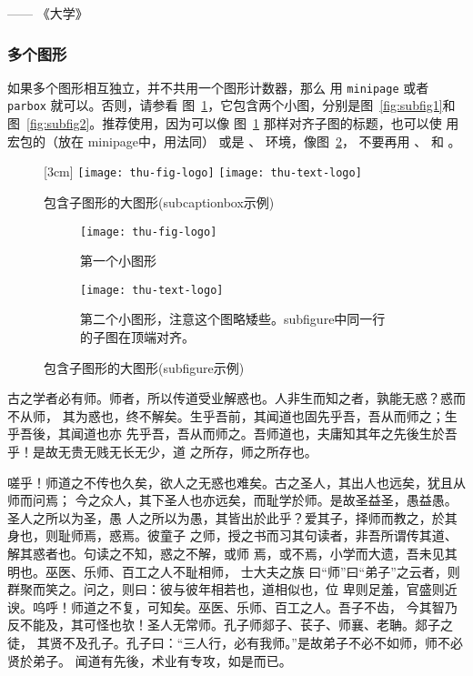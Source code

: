 \hfill —— 《大学》


\subsubsection{多个图形}
\label{sec:multifig}

如果多个图形相互独立，并不共用一个图形计数器，那么
用 \texttt{minipage} 或者\texttt{parbox} 就可以。否则，请参看
图~\ref{fig:big1-subcaptionbox}，它包含两个小图，分别是图~\ref{fig:subfig1}和
图~\ref{fig:subfig2}。推荐使用，因为可以像
图~\ref{fig:big1-subcaptionbox} 那样对齐子图的标题，也可以使
用宏包的（放在 minipage中，用法同）
或是  、 环境，像图~\ref{fig:big1-subfigure}，
不要再用 、 和 。

\begin{figure}[h]
  \centering%
  [3cm] %
    {\texttt{[image: thu-fig-logo]}}%
  \hspace{4em}%
      {\texttt{[image: thu-text-logo]}}
  \caption{包含子图形的大图形(subcaptionbox示例)}
  \label{fig:big1-subcaptionbox}
\end{figure}
\begin{figure}[h]
  \centering%
  \begin{subfigure}{3cm}
    \texttt{[image: thu-fig-logo]}
    \caption{第一个小图形}
  \end{subfigure}%
  \hspace{4em}%
  \begin{subfigure}{0.5\textwidth}
    \texttt{[image: thu-text-logo]}
    \caption{第二个小图形，注意这个图略矮些。subfigure中同一行的子图在顶端对齐。}
  \end{subfigure}
  \caption{包含子图形的大图形(subfigure示例)}
  \label{fig:big1-subfigure}
\end{figure}

古之学者必有师。师者，所以传道受业解惑也。人非生而知之者，孰能无惑？惑而不从师，
其为惑也，终不解矣。生乎吾前，其闻道也固先乎吾，吾从而师之；生乎吾後，其闻道也亦
先乎吾，吾从而师之。吾师道也，夫庸知其年之先後生於吾乎！是故无贵无贱无长无少，道
之所存，师之所存也。

嗟乎！师道之不传也久矣，欲人之无惑也难矣。古之圣人，其出人也远矣，犹且从师而问焉；
今之众人，其下圣人也亦远矣，而耻学於师。是故圣益圣，愚益愚。圣人之所以为圣，愚
人之所以为愚，其皆出於此乎？爱其子，择师而教之，於其身也，则耻师焉，惑焉。彼童子
之师，授之书而习其句读者，非吾所谓传其道、解其惑者也。句读之不知，惑之不解，或师
焉，或不焉，小学而大遗，吾未见其明也。巫医、乐师、百工之人不耻相师，  士大夫之族
曰“师”曰“弟子”之云者，则群聚而笑之。问之，则曰：彼与彼年相若也，道相似也，位
卑则足羞，官盛则近谀。呜呼！师道之不复，可知矣。巫医、乐师、百工之人。吾子不齿，
今其智乃反不能及，其可怪也欤！圣人无常师。孔子师郯子、苌子、师襄、老聃。郯子之徒，
其贤不及孔子。孔子曰：“三人行，必有我师。”是故弟子不必不如师，师不必贤於弟子。
闻道有先後，术业有专攻，如是而已。

